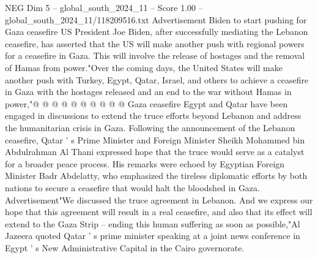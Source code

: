 \begin{textsample}{NEG Dim 5 – global\_south\_2024\_11 – Score 1.00 – global\_south\_2024\_11/118209516.txt}
Advertisement Biden to start pushing for Gaza ceasefire US President Joe Biden, after successfully mediating the Lebanon ceasefire, has asserted that the US will make another push with regional powers for a ceasefire in Gaza.
This will involve the release of hostages and the removal of Hamas from power."Over the coming days, the United States will make another push with Turkey, Egypt, Qatar, Israel, and others to achieve a ceasefire in Gaza with the hostages released and an end to the war without Hamas in power,"@ @ @ @ @ @ @ @ @ @ Gaza ceasefire Egypt and Qatar have been engaged in discussions to extend the truce efforts beyond Lebanon and address the humanitarian crisis in Gaza.
Following the announcement of the Lebanon ceasefire, Qatar ' s Prime Minister and Foreign Minister Sheikh Mohammed bin Abdulrahman Al Thani expressed hope that the truce would serve as a catalyst for a broader peace process.
His remarks were echoed by Egyptian Foreign Minister Badr Abdelatty, who emphasized the tireless diplomatic efforts by both nations to secure a ceasefire that would halt the bloodshed in Gaza.
Advertisement"We discussed the truce agreement in Lebanon.
And we express our hope that this agreement will result in a real ceasefire, and also that its effect will extend to the Gaza Strip -- ending this human suffering as soon as possible,"Al Jazeera quoted Qatar ' s prime minister speaking at a joint news conference in Egypt ' s New Administrative Capital in the Cairo governorate.

\end{textsample}
